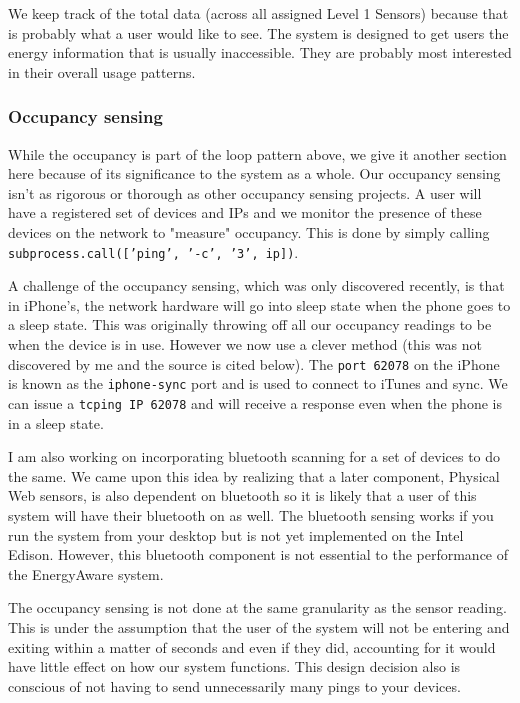 \documentclass{sig-alternate-05-2015}
\begin{document}
We keep track of the total data (across all assigned Level 1 Sensors) because that is probably what a user would like to see. The system is designed to get users the energy information that is usually inaccessible. They are probably most interested in their overall usage patterns.

\subsubsection{Occupancy sensing}

While the occupancy is part of the loop pattern above, we give it another section here because of its significance to the system as a whole. Our occupancy sensing isn't as rigorous or thorough as other occupancy sensing projects. A user will have a registered set of devices and IPs and we monitor the presence of these devices on the network to "measure" occupancy. This is done by simply calling \texttt{subprocess.call(['ping', '-c', '3', ip])}.

A challenge of the occupancy sensing, which was only discovered recently, is that in iPhone's, the network hardware will go into sleep state when the phone goes to a sleep state. This was originally throwing off all our occupancy readings to be when the device is in use. However we now use a clever method (this was not discovered by me and the source is cited below). The \texttt{port 62078} on the iPhone is known as the \texttt{iphone-sync} port and is used to connect to iTunes and sync. We can issue a \texttt{tcping IP 62078} and will receive a response even when the phone is in a sleep state.

I am also working on incorporating bluetooth scanning for a set of devices to do the same. We came upon this idea by realizing that a later component, Physical Web sensors, is also dependent on bluetooth so it is likely that a user of this system will have their bluetooth on as well. The bluetooth sensing works if you run the system from your desktop but is not yet implemented on the Intel Edison. However, this bluetooth component is not essential to the performance of the EnergyAware system.

The occupancy sensing is not done at the same granularity as the sensor reading. This is under the assumption that the user of the system will not be entering and exiting within a matter of seconds and even if they did, accounting for it would have little effect on how our system functions. This design decision also is conscious of not having to send unnecessarily many pings to your devices.
\end{document}

